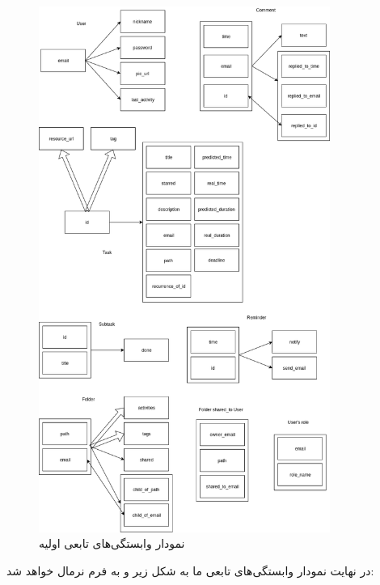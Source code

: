\documentclass{article}
\begin{document}
\begin{figure}[H]
  \centering  
  \includegraphics[width = 0.85\textwidth]{Fucntional_Dependancy.png}
  \caption{نمودار وابستگی‌های تابعی اولیه}
  \label{fig:fd1}
\end{figure}

در نهایت نمودار وابستگی‌های تابعی ما به شکل زیر و به فرم نرمال  خواهد شد:
\end{document}

